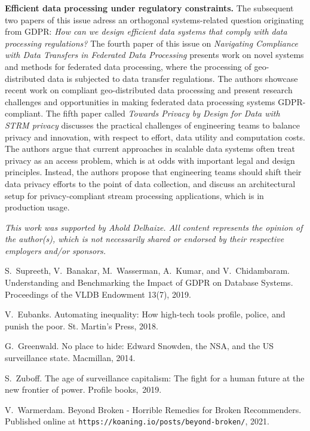 \documentclass[11pt]{article}
\begin{document}
\vspace{0.1cm}
\noindent\textbf{Efficient data processing under regulatory constraints.} The subsequent two papers of this issue adress an orthogonal systems-related question originating from GDPR: {\em How can we design efficient data systems that comply with data processing regulations?} 
%
The fourth paper of this issue on {\em Navigating Compliance with Data Transfers in Federated Data Processing} presents work on novel systems and methods for federated data processing, where the processing of geo-distributed data is subjected to data transfer regulations. The authors showcase recent work on compliant geo-distributed data processing and present research challenges and opportunities in making federated data processing systems GDPR-compliant.
%
The fifth paper called {\em Towards Privacy by Design for Data with \MakeUppercase{strm} privacy} discusses the practical challenges of engineering teams to balance privacy and innovation, with respect to effort, data utility and computation costs. The authors argue that current approaches in scalable data systems often treat privacy as an access problem, which is at odds with important legal and design principles. Instead, the authors propose that engineering teams should shift their data privacy efforts to the point of data collection, and discuss an architectural setup for privacy-compliant stream processing applications, which is in production usage.

\vspace{1cm}
\noindent\small{\em{This work was supported by Ahold Delhaize. All content represents the opinion of the author(s), which is not necessarily shared or endorsed by their respective employers and/or sponsors.}}

\begin{thebibliography}{10}
\itemsep=1pt
\begin{small}

S.~Supreeth, V.~Banakar, M.~Wasserman, A.~Kumar, and V.~Chidambaram.
\newblock Understanding and Benchmarking the Impact of GDPR on Database Systems.
\newblock Proceedings of the VLDB Endowment 13(7), 2019.

V.~Eubanks.
\newblock Automating inequality: How high-tech tools profile, police, and punish the poor. 
\newblock St. Martin's Press, 2018.

G.~Greenwald.
\newblock No place to hide: Edward Snowden, the NSA, and the US surveillance state. 
\newblock Macmillan, 2014.

S.~Zuboff.
\newblock The age of surveillance capitalism: The fight for a human future at the new frontier of power.
\newblock Profile books,~2019.

V.~Warmerdam.
\newblock Beyond Broken - Horrible Remedies for Broken Recommenders.
\newblock Published online at \footnotesize{\texttt{https://koaning.io/posts/beyond-broken/}}, 2021.



\end{small}
\end{thebibliography}
\end{document}
